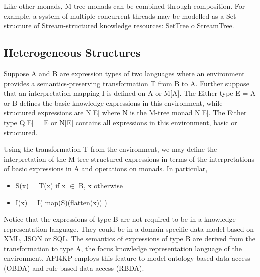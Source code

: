 \documentclass[runningheads]{llncs}
\begin{document}
Like other monads, M-tree monads can be combined through composition.
For example, a system of multiple concurrent threads may be modelled as a Set-structure of Stream-structured knowledge resources: SetTree o StreamTree.


\subsection{Heterogeneous Structures}
Suppose A and B are expression types of two languages where an environment provides a semantics-preserving transformation T from B to A.
Further suppose that an interpretation mapping I is defined on A or M[A].
The Either type E = A or B defines the basic knowledge expressions in this environment, while structured expressions are N[E] where N is the M-tree monad  N[E].
The Either type Q[E] = E or N[E] contains all expressions in this environment, basic or structured. 

Using the transformation T from the environment, we may define the interpretation of the M-tree structured expressions in terms of the interpretations of basic expressions in A and operations on monads. In particular,
\begin{itemize}
\item S(x) = T(x) if x $\in$ B, x otherwise
\item I(x) = I( map(S)(flatten(x)) )
\end{itemize}
Notice that the expressions of type B are not required to be in a knowledge representation language. They could be in a domain-specific data model based on XML, JSON or SQL. The semantics of expressions of type B are derived from the transformation to type A, the focus  knowledge representation language of the environment. API4KP employs this feature to model ontology-based data access (OBDA) and rule-based data access (RBDA).
\end{document}
